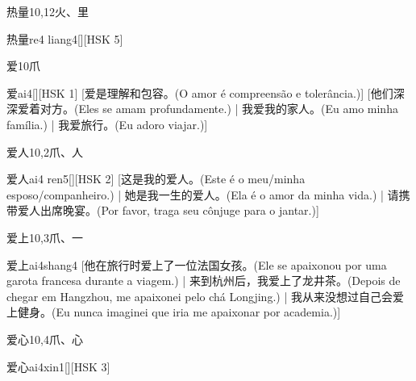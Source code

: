 \begin{entry}{热量}{10,12}{⽕、⾥}
  \begin{phonetics}{热量}{re4 liang4}[][HSK 5]
  \end{phonetics}
\end{entry}

\begin{entry}{爱}{10}{⽖}
  \begin{phonetics}{爱}{ai4}[][HSK 1]
    [爱是理解和包容。(O amor é compreensão e tolerância.)]
    [他们深深爱着对方。(Eles se amam profundamente.) | 我爱我的家人。(Eu amo minha família.) | 我爱旅行。(Eu adoro viajar.)]
  \end{phonetics}
\end{entry}

\begin{entry}{爱人}{10,2}{⽖、⼈}
  \begin{phonetics}{爱人}{ai4 ren5}[][HSK 2]
    [这是我的爱人。(Este é o meu/minha esposo/companheiro.) | 她是我一生的爱人。(Ela é o amor da minha vida.) | 请携带爱人出席晚宴。(Por favor, traga seu cônjuge para o jantar.)]
  \end{phonetics}
\end{entry}

\begin{entry}{爱上}{10,3}{⽖、⼀}
  \begin{phonetics}{爱上}{ai4shang4}
    [他在旅行时爱上了一位法国女孩。(Ele se apaixonou por uma garota francesa durante a viagem.)  | 来到杭州后，我爱上了龙井茶。(Depois de chegar em Hangzhou, me apaixonei pelo chá Longjing.) | 我从来没想过自己会爱上健身。(Eu nunca imaginei que iria me apaixonar por academia.)]
  \end{phonetics}
\end{entry}

\begin{entry}{爱心}{10,4}{⽖、⼼}
  \begin{phonetics}{爱心}{ai4xin1}[][HSK 3]
  \end{phonetics}
\end{entry}

